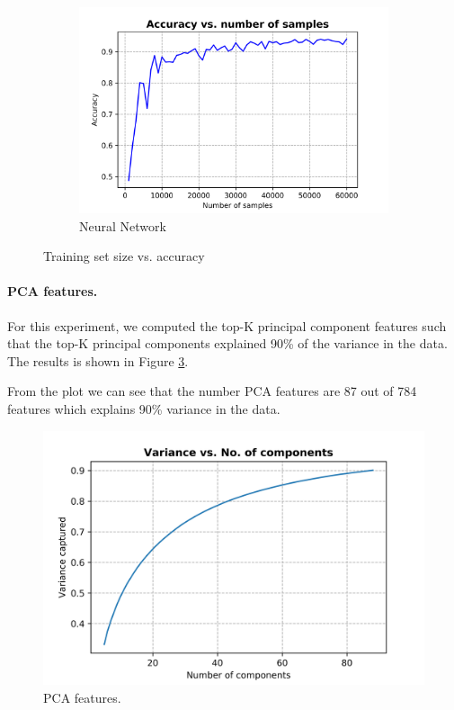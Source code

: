 \documentclass[10pt]{scrartcl}
\begin{document}
\begin{figure}[H]
\begin{subfigure}{0.4\linewidth}
		\includegraphics[width=1\linewidth]{figures/accuracy_vs_samples_neural_net_default}
		\caption{Neural Network}\label{fig:1b}
	\end{subfigure}
	\caption{Training set size vs. accuracy}\label{fig:1}
\end{figure}

\paragraph{PCA features.}
For this experiment, we computed the top-K principal component features such that the top-K principal components explained 90\% of the variance in the data. 
The results is shown in Figure \ref{fig:pca_features}.

From the plot we can see that the number PCA features are 87 out of 784 features which explains 90\% variance in the data.
\begin{figure}[H]
\centering
\includegraphics[width=0.5\linewidth]{figures/pca_variance_vs_no_comp.png}
\caption{PCA features. \label{fig:pca_features}}
\end{figure}

\pagebreak
\end{document}
